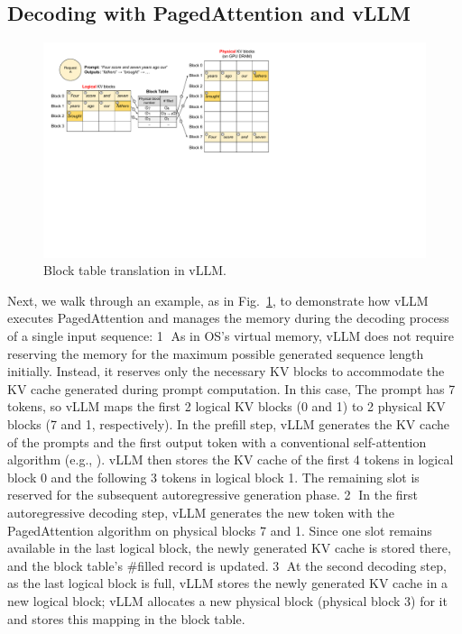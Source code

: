 \documentclass[sigplan,10pt]{acmart}
\newcommand{\tech}[0]{PagedAttention\xspace}
\newcommand{\sys}[0]{vLLM\xspace}
\begin{document}
\subsection{Decoding with \tech and \sys}
\label{sec:one-sequence-decoding-example}

\begin{figure}
    \centering
    \includegraphics[width=\columnwidth]{figures/logical-and-physical-block-table.pdf}
    \vspace{-15pt}
    \caption{Block table translation in \sys. }
    \label{fig:block-table-translation}
    \vspace{-15pt}
\end{figure}

Next, we walk through an example, as in Fig.~\ref{fig:block-table-translation}, to demonstrate how \sys executes \tech and manages the memory during the decoding process of a single input sequence: \textcircled{\small 1} As in OS's virtual memory, \sys does not require reserving the memory for the maximum possible generated sequence length initially.
Instead, it reserves only the necessary KV blocks to accommodate the KV cache generated during prompt computation. In this case, The prompt has 7 tokens, so \sys maps the first 2 logical KV blocks (0 and 1) to 2 physical KV blocks (7 and 1, respectively). In the prefill step, \sys generates the KV cache of the prompts and the first output token with a conventional self-attention algorithm (e.g., \cite{dao2022flashattention}). \sys then stores the KV cache of the first 4 tokens in logical block 0 and the following 3 tokens in logical block 1. The remaining slot is reserved for the subsequent autoregressive generation phase. 
\textcircled{\small 2} In the first autoregressive decoding step, \sys generates the new token with the \tech algorithm on physical blocks 7 and 1. Since one slot remains available in the last logical block, the newly generated KV cache is stored there, and the block table's \#filled record is updated. \textcircled{\small 3} At the second decoding step, as the last logical block is full, \sys stores the newly generated KV cache in a new logical block; \sys allocates a new physical block (physical block 3) for it and stores this mapping in the block table.
\end{document}
